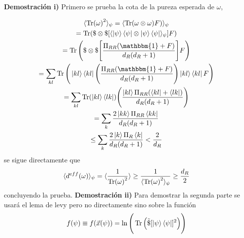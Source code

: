 \textbf{Demostración i)}
Primero se prueba la cota de la pureza esperada de $\omega$,

\begin{multline}
\langle \Tr (\omega)^{2} \rangle_{\psi} = \langle \Tr(\omega \otimes \omega)F) \rangle_{\psi}\\
= \Tr(\$ \otimes \$ [ \langle \ket{\psi} \bra{\psi} \otimes \ket{\psi} \bra{\psi} \rangle_{\psi}]F)\\
=\Tr \Bigg( \$ \otimes \$ \Bigg[ \frac{\Pi_{RR}(\mathbbm{1}+F)}{d_{R}(d_{R}+1)} \Bigg]F \Bigg)\\
= \sum_{kl} \Tr \Bigg(  \ket{kl}\bra{kl}  \Bigg(  \frac{\Pi_{RR}(\mathbbm{1}+F)}{d_{R}(d_{R}+1)} \Bigg) \ket{kl}\bra{kl} F \Bigg)\\
=\sum_{kl} \Tr ( \ket{kl}\bra{lk} ) \Bigg( \frac{\ket{kl} \Pi_{RR}(\bra{kl}+\bra{lk})}{d_{R}(d_{R}+1)}  \Bigg)\\
=\sum_{k} \frac{2 \ket{kk} \Pi_{RR}\bra{kk}}{d_{R}(d_{R}+1)} \\
\leq \sum_{k} \frac{2 \ket{k} \Pi_{R}\bra{k}}{d_{R}(d_{R}+1)} < \frac{2}{d_{R}}
\end{multline}
se sigue directamente que 
\begin{equation}
\langle d^{eff}(\omega) \rangle_{\psi} = \langle\frac{1}{\Tr (\omega)^{2}} \rangle \geq \frac{1}{\langle \Tr (\omega)^{2} \rangle_{\psi}} \geq \frac{d_{R}}{2}
\end{equation}
concluyendo la prueba.
\textbf{Demostración ii)}
Para demostrar la segunda parte se usará el lema de levy pero no directamente sino sobre la función 
\begin{equation}
f(\psi) \equiv f(\vec{x}(\psi)) = \ln \Bigg( \Tr \Big( \tilde{\$}[ \ket{\psi}\bra{\psi}]^{2} \Big) \Bigg)
\end{equation}

